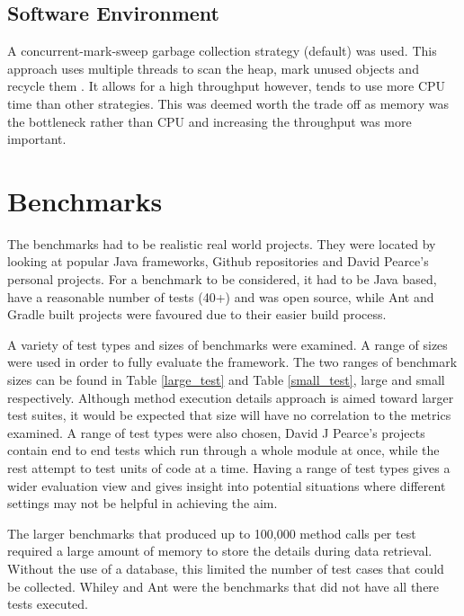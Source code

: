 \subsection{Software Environment}

A concurrent-mark-sweep garbage collection strategy (default) was used. This approach uses multiple threads to scan the heap, mark unused objects and recycle them \cite{oracle2015}. It allows for a high throughput however, tends to use more CPU time than other strategies. This was deemed worth the trade off as memory was the bottleneck rather than CPU and increasing the throughput was more important.

\section{Benchmarks}
\label{S:bench}
The benchmarks had to be realistic real world projects. They were located by looking at popular Java frameworks, Github repositories and David Pearce's personal projects. For a benchmark to be considered, it had to be Java based, have a reasonable number of tests (40+) and was open source, while Ant and Gradle built projects were favoured due to their easier build process.

A variety of test types and sizes of benchmarks were examined. A range of sizes were used in order to fully evaluate the framework. The two ranges of benchmark sizes can be found in Table \ref{large_test} and Table \ref{small_test}, large and small respectively. Although method execution details approach is aimed toward larger test suites, it would be expected that size will have no correlation to the metrics examined. A range of test types were also chosen, David J Pearce's projects contain end to end tests which run through a whole module at once, while the rest attempt to test units of code at a time. Having a range of test types gives a wider evaluation view and gives insight into potential situations where different settings may not be helpful in achieving the aim.

The larger benchmarks that produced up to 100,000 method calls per test required a large amount of memory to store the details during data retrieval. Without the use of a database, this limited the number of test cases that could be collected. Whiley and Ant were the benchmarks that did not have all there tests executed.  

